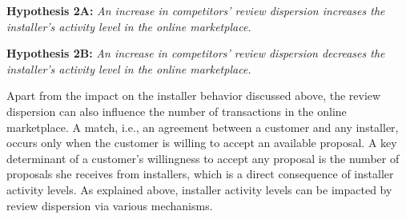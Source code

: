 \documentclass[msom,blindrev]{informs3}
\begin{document}
%
%
	
	
	\noindent\textbf{Hypothesis 2A:} \emph{An increase in competitors' review dispersion increases the installer's activity level in the online marketplace.}
	
	\noindent\textbf{Hypothesis 2B:} \emph{An increase in competitors' review dispersion decreases the installer's activity level in the online marketplace.}


Apart from the impact on the installer behavior discussed above, the review dispersion can also influence the number of transactions in the online marketplace.  A match, i.e., an agreement between a customer and any installer, occurs only when the customer is willing to accept an available proposal. A key determinant of a customer's willingness to accept any proposal is the number of proposals she receives from installers, which is a direct consequence of installer activity levels. As explained above, installer activity levels can be impacted by review dispersion via various mechanisms.
\end{document}
